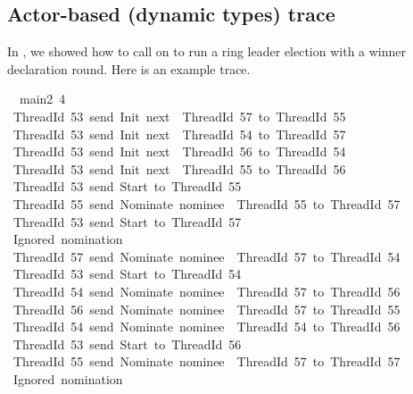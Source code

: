 \documentclass[sigplan,screen]{acmart}
\begin{document}
\subsection{Actor-based (dynamic types) trace}
\label{apx:main2-trace}

In , we showed how to call  on
 to run a ring leader election with a winner declaration round.
%
Here is an example trace.

\scriptsize

\begin{tabbing}\ttfamily
~~main2~4\\
\ttfamily ~ThreadId~53~send~Init~next~~ThreadId~57~to~ThreadId~55\\
\ttfamily ~ThreadId~53~send~Init~next~~ThreadId~54~to~ThreadId~57\\
\ttfamily ~ThreadId~53~send~Init~next~~ThreadId~56~to~ThreadId~54\\
\ttfamily ~ThreadId~53~send~Init~next~~ThreadId~55~to~ThreadId~56\\
\ttfamily ~ThreadId~53~send~Start~to~ThreadId~55\\
\ttfamily ~ThreadId~55~send~Nominate~nominee~~ThreadId~55~to~ThreadId~57\\
\ttfamily ~ThreadId~53~send~Start~to~ThreadId~57\\
\ttfamily ~Ignored~nomination\\
\ttfamily ~ThreadId~57~send~Nominate~nominee~~ThreadId~57~to~ThreadId~54\\
\ttfamily ~ThreadId~53~send~Start~to~ThreadId~54\\
\ttfamily ~ThreadId~54~send~Nominate~nominee~~ThreadId~57~to~ThreadId~56\\
\ttfamily ~ThreadId~56~send~Nominate~nominee~~ThreadId~57~to~ThreadId~55\\
\ttfamily ~ThreadId~54~send~Nominate~nominee~~ThreadId~54~to~ThreadId~56\\
\ttfamily ~ThreadId~53~send~Start~to~ThreadId~56\\
\ttfamily ~ThreadId~55~send~Nominate~nominee~~ThreadId~57~to~ThreadId~57\\
\ttfamily ~Ignored~nomination\\

\end{tabbing}
\end{document}
